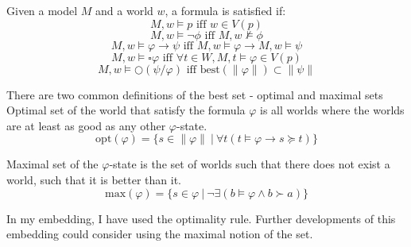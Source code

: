 \documentclass[sigconf,11pt]{acmart}
\begin{document}
Given a model $M$ and a world $w$, a formula is satisfied if:
$$M,w \vDash p \text{ iff } w \in V(p)$$
$$M,w \vDash \neg\phi \text{ iff } M,w \nvDash \phi$$
$$M,w \vDash \varphi \to \psi \text{ iff } M,w \vDash \varphi \to M,w \vDash \psi $$
$$M,w \vDash \square\varphi \text{ iff } \forall t \in W, M,t \vDash \varphi \in V(p)$$
$$M,w \vDash \bigcirc(\psi/\varphi) \text{ iff } \text{best}(\|\varphi\|) \subset \|\psi\|$$

There are two common definitions of the best set - optimal and maximal sets
Optimal set of the world that satisfy the formula $\varphi$ is all worlds where the worlds are at least as good as any other $\varphi$-state.
$$\text{opt}(\varphi) = \lbrace s \in \| \varphi \|\ |\ \forall t (t \vDash \varphi \to s \succeq t) \rbrace$$  

Maximal set of the $\varphi$-state is the set of worlds such that there does not exist a world, such that it is better than it.
$$\text{max}(\varphi) = \lbrace s \in \varphi\ |\ \neg\exists (b \vDash \varphi \land b \succ a)  \rbrace$$

In my embedding, I have used the optimality rule. Further developments of this embedding could consider using the maximal notion of the set. 
\end{document}
